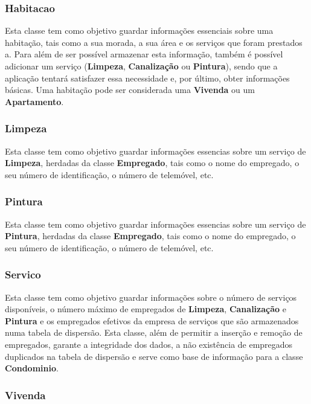 \documentclass[a4paper]{article}
\begin{document}
\subsubsection{Habitacao}

Esta classe tem como objetivo guardar informações essenciais sobre uma habitação, tais como a sua morada, a sua área e os serviços que foram prestados a. Para além de ser possível armazenar esta informação, também é possível adicionar um serviço (\textbf{Limpeza}, \textbf{Canalização} ou \textbf{Pintura}), sendo que a aplicação tentará satisfazer essa necessidade e, por último, obter informações básicas. Uma habitação pode ser considerada uma \textbf{Vivenda} ou um \textbf{Apartamento}.

\subsubsection{Limpeza}

Esta classe tem como objetivo guardar informações essencias sobre um serviço de \textbf{Limpeza}, herdadas da classe \textbf{Empregado}, tais como o nome do empregado, o seu número de identificação, o número de telemóvel, etc.

\subsubsection{Pintura}

Esta classe tem como objetivo guardar informações essencias sobre um serviço de \textbf{Pintura}, herdadas da classe \textbf{Empregado}, tais como o nome do empregado, o seu número de identificação, o número de telemóvel, etc.

\subsubsection{Servico}

Esta classe tem como objetivo guardar informações sobre o número de serviços disponíveis, o número máximo de empregados de \textbf{Limpeza}, \textbf{Canalização} e \textbf{Pintura} e os empregados efetivos da empresa de serviços que são armazenados numa tabela de dispersão. Esta classe, além de permitir a inserção e remoção de empregados, garante a integridade dos dados, a não existência de empregados duplicados na tabela de dispersão e serve como base de informação para a classe \textbf{Condominio}. 

\subsubsection{Vivenda}
\end{document}
